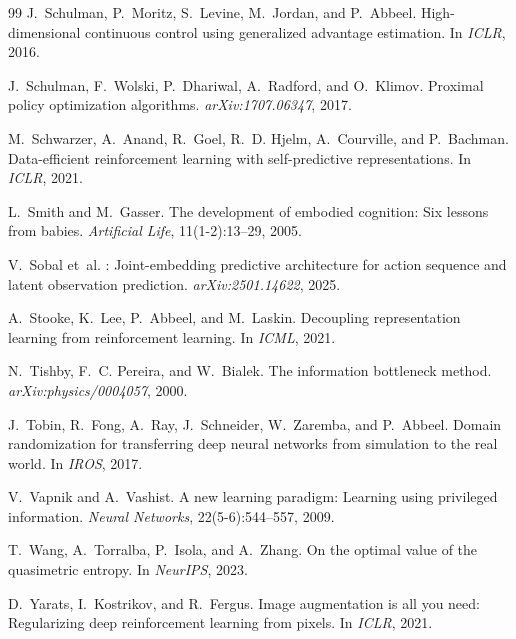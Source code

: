 \documentclass{article}
\begin{document}
\begin{thebibliography}{99}
J.~Schulman, P.~Moritz, S.~Levine, M.~Jordan, and P.~Abbeel.
\newblock High-dimensional continuous control using generalized advantage
  estimation.
\newblock In \emph{ICLR}, 2016.

J.~Schulman, F.~Wolski, P.~Dhariwal, A.~Radford, and O.~Klimov.
\newblock Proximal policy optimization algorithms.
\newblock \emph{arXiv:1707.06347}, 2017.

M.~Schwarzer, A.~Anand, R.~Goel, R.~D. Hjelm, A.~Courville, and P.~Bachman.
\newblock Data-efficient reinforcement learning with self-predictive
  representations.
\newblock In \emph{ICLR}, 2021.

L.~Smith and M.~Gasser.
\newblock The development of embodied cognition: Six lessons from babies.
\newblock \emph{Artificial Life}, 11(1-2):13--29, 2005.

V.~Sobal et~al.
: Joint-embedding predictive architecture for action
sequence and latent observation prediction.
\newblock \emph{arXiv:2501.14622}, 2025.

A.~Stooke, K.~Lee, P.~Abbeel, and M.~Laskin.
\newblock Decoupling representation learning from reinforcement learning.
\newblock In \emph{ICML}, 2021.

N.~Tishby, F.~C. Pereira, and W.~Bialek.
\newblock The information bottleneck method.
\newblock \emph{arXiv:physics/0004057}, 2000.

J.~Tobin, R.~Fong, A.~Ray, J.~Schneider, W.~Zaremba, and P.~Abbeel.
\newblock Domain randomization for transferring deep neural networks from
  simulation to the real world.
\newblock In \emph{IROS}, 2017.

V.~Vapnik and A.~Vashist.
\newblock A new learning paradigm: Learning using privileged information.
\newblock \emph{Neural Networks}, 22(5-6):544--557, 2009.

T.~Wang, A.~Torralba, P.~Isola, and A.~Zhang.
\newblock On the optimal value of the quasimetric entropy.
\newblock In \emph{NeurIPS}, 2023.

D.~Yarats, I.~Kostrikov, and R.~Fergus.
\newblock Image augmentation is all you need: Regularizing deep reinforcement
  learning from pixels.
\newblock In \emph{ICLR}, 2021.

\end{thebibliography}
\end{document}
